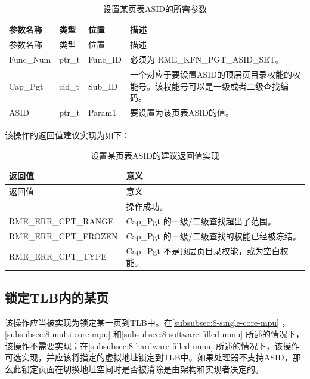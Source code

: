 \begin{xltabular}{\textwidth}{@{}>{\hsize\raggedright\arraybackslash}X>{\hsize\raggedright\arraybackslash}X>{\hsize\raggedright\arraybackslash}X>{\hsize\raggedright\arraybackslash}X@{}}
\caption{设置某页表ASID的所需参数}\label{tab:8-9-set-page-table-asid-parameters}\\
\toprule
参数名称 & 类型 & 位置 & 描述\tabularnewline
\endfirsthead
\toprule
参数名称 & 类型 & 位置 & 描述\tabularnewline
\midrule
\endhead
\bottomrule
\endlastfoot
Func\_Num & ptr\_t & Func\_ID & 必须为 RME\_KFN\_PGT\_ASID\_SET。\tabularnewline
Cap\_Pgt & cid\_t & Sub\_ID &
一个对应于要设置ASID的顶层页目录权能的权能号。该权能号可以是一级或者二级查找编码。\tabularnewline
ASID & ptr\_t & Param1 & 要设置为该页表ASID的值。\tabularnewline
\end{xltabular}

该操作的返回值建议实现为如下：

\begin{xltabular}{\textwidth}{@{}>{\hsize\raggedright\arraybackslash}X>{\hsize\raggedright\arraybackslash}X@{}}
\caption{设置某页表ASID的建议返回值实现}\label{tab:8-10-set-page-table-asid-suggested-return-values}\\
\toprule
返回值 & 意义\tabularnewline
\endfirsthead
\toprule
返回值 & 意义\tabularnewline
\midrule
\endhead
\bottomrule
{} & 操作成功。\tabularnewline
    RME\_ERR\_CPT\_RANGE & Cap\_Pgt 的一级/二级查找超出了范围。\tabularnewline
    RME\_ERR\_CPT\_FROZEN & Cap\_Pgt 的一级/二级查找的权能已经被冻结。\tabularnewline
    RME\_ERR\_CPT\_TYPE & Cap\_Pgt 不是顶层页目录权能，或为空白权能。\tabularnewline
\end{xltabular}

\subsection{锁定TLB内的某页}\label{subsec:8-lock-page-in-tlb}

该操作应当被实现为锁定某一页到TLB中。在\ref{subsubsec:8-single-core-mpu}
，\ref{subsubsec:8-multi-core-mpu}
和\ref{subsubsec:8-software-filled-mmu}
所述的情况下，该操作不需要实现；在\ref{subsubsec:8-hardware-filled-mmu}
所述的情况下，该操作可选实现，并应该将指定的虚拟地址锁定到TLB中。如果处理器不支持ASID，那么此锁定页面在切换地址空间时是否被清除是由架构和实现者决定的。

